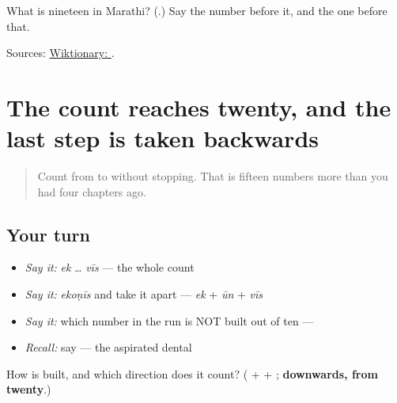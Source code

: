 \begin{tcolorbox}[breakable,colback=teal!4,colframe=teal!35!black,title={Before you move on}]
What is nineteen in Marathi? (\textbf{}.) Say the number before it, and the one before that.

Sources: \href{https://en.wiktionary.org/wiki/\%E0\%A4\%8F\%E0\%A4\%95\%E0\%A5\%8B\%E0\%A4\%A3\%E0\%A5\%80\%E0\%A4\%B8}{Wiktionary: }.
\end{tcolorbox}
\section[\texorpdfstring{\mr{सतरा} · \mr{अठरा} … (satrā · aṭhrā …)}{सतरा · अठरा … (satrā · aṭhrā …)}]{The count reaches twenty, and the last step is taken backwards}

\label{lesson:MR-R58-seventeen-to-twenty}



\begin{quote}
Count from \textbf{} to \textbf{} without stopping. That is fifteen numbers more than you had four chapters ago.
\end{quote}

\subsection*{Your turn}
\begin{itemize}
\raggedright
  \item \emph{Say it:} \emph{ek} … \emph{vīs} — the whole count
  \item \emph{Say it:} \emph{ekoṇīs} and take it apart — \emph{ek} + \emph{ūn} + \emph{vīs}
  \item \emph{Say it:} which number in the run is NOT built out of ten — \emph{\textbf{}}
  \item \emph{Recall:} say \emph{} — the aspirated dental
\end{itemize}

\begin{tcolorbox}[breakable,colback=teal!4,colframe=teal!35!black,title={Before you move on}]
How is \textbf{} built, and which direction does it count? (\emph{\textbf{}} + \emph{\textbf{}} + \emph{\textbf{}}; \textbf{downwards, from twenty}.)
\end{tcolorbox}
